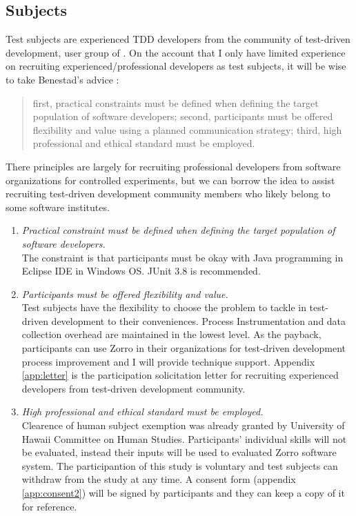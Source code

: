 \subsection{Subjects}
Test subjects are experienced TDD developers from the community of
test-driven development, user group of \cite{TddYahooGroup}. On the
account that I only have limited experience on recruiting
experienced/professional developers as test subjects, it will be wise to
take Benestad's advice \cite{Benestad}:
\begin{quote}
  first, practical constraints must be defined when defining the target
  population of software developers; second, participants must be offered
  flexibility and value using a planned communication strategy; third, high
  professional and ethical standard must be employed.
\end{quote} 
There principles are largely for recruiting professional developers from
software organizations for controlled experiments, but we can borrow the
idea to assist recruiting test-driven development community members who
likely belong to some software institutes.

\begin{enumerate}
\item \textit{Practical constraint must be defined when defining the
    target population of software developers.}\\
  The constraint is that participants must be okay with Java programming in
  Eclipse IDE in Windows OS. JUnit 3.8 is recommended.
\item \textit{Participants must be offered flexibility and value.}\\
  Test subjects have the flexibility to choose the problem to tackle in
  test-driven development to their conveniences. Process Instrumentation
  and data collection overhead are maintained in the lowest level. As the
  payback, participants can use Zorro in their organizations for
  test-driven development process improvement and I will provide technique
  support. Appendix \ref{app:letter} is the participation solicitation
  letter for recruiting experienced developers from test-driven development
  community.
\item \textit{High professional and ethical standard must be employed.}\\
  Clearence of human subject exemption was already granted by University of
  Hawaii Committee on Human Studies. Participants' individual skills will
  not be evaluated, instead their inputs will be used to evaluated Zorro
  software system. The participantion of this study is voluntary and test
  subjects can withdraw from the study at any time. A consent form
  (appendix \ref{app:consent2}) will be signed by participants and they can
  keep a copy of it for reference.
\end{enumerate}

